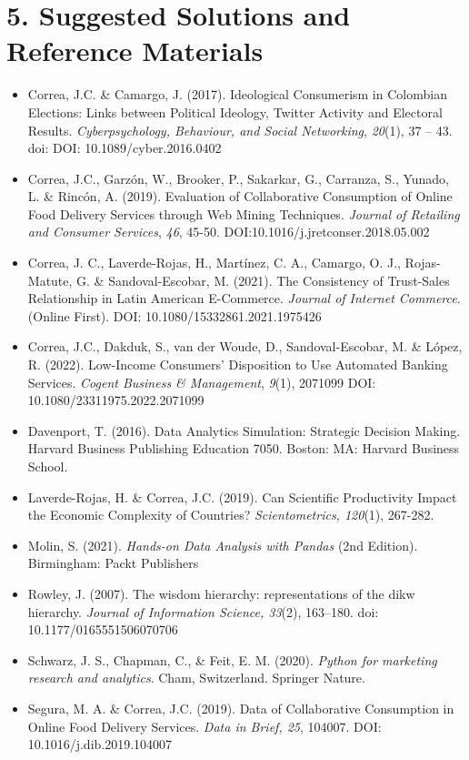 \documentclass[letterpaper,11pt]{article}
\begin{document}
\section{5. Suggested Solutions and Reference Materials}
\begin{itemize}
\item Correa, J.C. \& Camargo, J. (2017). Ideological Consumerism in Colombian Elections: Links between Political Ideology, Twitter Activity and Electoral Results. \textit{Cyberpsychology, Behaviour, and Social Networking}, \textit{20}(1), 37 – 43. doi: DOI: 10.1089/cyber.2016.0402
\item Correa, J.C., Garzón, W., Brooker, P., Sakarkar, G., Carranza, S., Yunado, L. \& Rincón, A. (2019). Evaluation of Collaborative Consumption of Online Food Delivery Services through Web Mining Techniques. \textit{Journal of Retailing and Consumer Services}, \textit{46}, 45-50. DOI:10.1016/j.jretconser.2018.05.002
\item Correa, J. C., Laverde-Rojas, H., Martínez, C. A., Camargo, O. J., Rojas-Matute, G. \& Sandoval-Escobar, M. (2021). The Consistency of Trust-Sales Relationship in Latin American E-Commerce. \textit{Journal of Internet Commerce}. (Online First). DOI: 10.1080/15332861.2021.1975426
\item Correa, J.C., Dakduk, S., van der Woude, D., Sandoval-Escobar, M. \& López, R. (2022). Low-Income Consumers’ Disposition to Use Automated Banking Services. \textit{Cogent Business \& Management}, \textit{9}(1), 2071099 DOI: 10.1080/23311975.2022.2071099
\item Davenport, T. (2016). Data Analytics Simulation: Strategic Decision Making. Harvard Business Publishing Education 7050. Boston: MA: Harvard Business School.
\item Laverde-Rojas, H. \& Correa, J.C. (2019). Can Scientific Productivity Impact the Economic Complexity of Countries? \textit{Scientometrics, 120}(1), 267-282. 
\item Molin, S. (2021). \textit{Hands-on Data Analysis with Pandas} (2nd Edition). Birmingham: Packt Publishers
\item Rowley, J. (2007). The wisdom hierarchy: representations of the dikw hierarchy. \textit{Journal of Information Science, 33}(2), 163–180. doi: 10.1177/0165551506070706
\item Schwarz, J. S., Chapman, C., \& Feit, E. M. (2020). \textit{Python for marketing research and analytics}. Cham, Switzerland. Springer Nature. 
\item Segura, M. A. \& Correa, J.C. (2019). Data of Collaborative Consumption in Online Food Delivery Services. \textit{Data in Brief, 25}, 104007. DOI: 10.1016/j.dib.2019.104007

\end{itemize}
\end{document}
